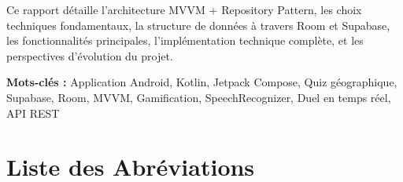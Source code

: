 \documentclass[12pt,a4paper,openany]{report}
\begin{document}
    \vspace{0.5cm}

    Ce rapport détaille l'architecture MVVM + Repository Pattern, les choix techniques fondamentaux, la structure de données à travers Room et Supabase, les fonctionnalités principales, l'implémentation technique complète, et les perspectives d'évolution du projet.

    \vspace{1cm}

    \noindent\textbf{Mots-clés :} Application Android, Kotlin, Jetpack Compose, Quiz géographique, Supabase, Room, MVVM, Gamification, SpeechRecognizer, Duel en temps réel, API REST

    \newpage
    \tableofcontents
    \newpage
    \listoffigures
    \newpage
    \listoftables

    \newpage
    \chapter*{Liste des Abréviations}
\end{document}
